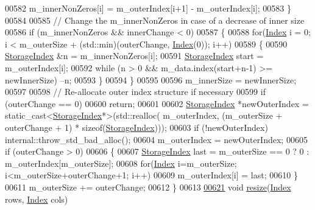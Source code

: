 \begin{DoxyCode}
00582           m\_innerNonZeros[i] = m\_outerIndex[i+1] - m\_outerIndex[i];
00583       \}
00584       
00585       \textcolor{comment}{// Change the m\_innerNonZeros in case of a decrease of inner size}
00586       \textcolor{keywordflow}{if} (m\_innerNonZeros && innerChange < 0)
00587       \{
00588         \textcolor{keywordflow}{for}(\hyperlink{group___core___module_a554f30542cc2316add4b1ea0a492ff02}{Index} i = 0; i < m\_outerSize + (std::min)(outerChange, \hyperlink{namespace_eigen_a62e77e0933482dafde8fe197d9a2cfde}{Index}(0)); i++)
00589         \{
00590           \hyperlink{group___sparse_core___module_a0b540ba724726ebe953f8c0df06081ed}{StorageIndex} &n = m\_innerNonZeros[i];
00591           \hyperlink{group___sparse_core___module_a0b540ba724726ebe953f8c0df06081ed}{StorageIndex} start = m\_outerIndex[i];
00592           \textcolor{keywordflow}{while} (n > 0 && m\_data.index(start+n-1) >= newInnerSize) --n; 
00593         \}
00594       \}
00595       
00596       m\_innerSize = newInnerSize;
00597 
00598       \textcolor{comment}{// Re-allocate outer index structure if necessary}
00599       \textcolor{keywordflow}{if} (outerChange == 0)
00600         \textcolor{keywordflow}{return};
00601           
00602       \hyperlink{group___sparse_core___module_a0b540ba724726ebe953f8c0df06081ed}{StorageIndex} *newOuterIndex = \textcolor{keyword}{static\_cast<}\hyperlink{group___sparse_core___module_a0b540ba724726ebe953f8c0df06081ed}{StorageIndex}*\textcolor{keyword}{>}(std::realloc(
      m\_outerIndex, (m\_outerSize + outerChange + 1) * \textcolor{keyword}{sizeof}(\hyperlink{group___sparse_core___module_a0b540ba724726ebe953f8c0df06081ed}{StorageIndex})));
00603       \textcolor{keywordflow}{if} (!newOuterIndex) internal::throw\_std\_bad\_alloc();
00604       m\_outerIndex = newOuterIndex;
00605       \textcolor{keywordflow}{if} (outerChange > 0)
00606       \{
00607         \hyperlink{group___sparse_core___module_a0b540ba724726ebe953f8c0df06081ed}{StorageIndex} last = m\_outerSize == 0 ? 0 : m\_outerIndex[m\_outerSize];
00608         \textcolor{keywordflow}{for}(\hyperlink{group___core___module_a554f30542cc2316add4b1ea0a492ff02}{Index} i=m\_outerSize; i<m\_outerSize+outerChange+1; i++)          
00609           m\_outerIndex[i] = last; 
00610       \}
00611       m\_outerSize += outerChange;
00612     \}
00613     
\hyperlink{group___sparse_core___module_af88551f30202341b7cc24cfadabdec5c}{00621}     \textcolor{keywordtype}{void} \hyperlink{group___sparse_core___module_af88551f30202341b7cc24cfadabdec5c}{resize}(\hyperlink{group___core___module_a554f30542cc2316add4b1ea0a492ff02}{Index} rows, \hyperlink{group___core___module_a554f30542cc2316add4b1ea0a492ff02}{Index} cols)

\end{DoxyCode}
